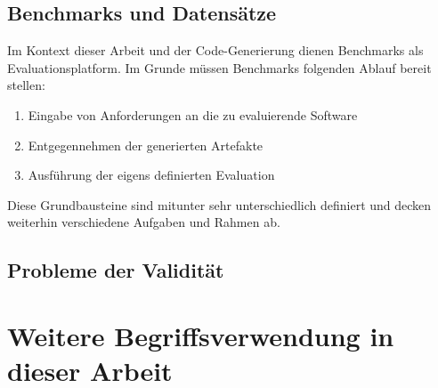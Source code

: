 
\subsection{Benchmarks und Datensätze}\label{ch:Benchmarks und Datensätze}

Im Kontext dieser Arbeit und der Code-Generierung dienen Benchmarks als Evaluationsplatform. Im Grunde müssen Benchmarks folgenden Ablauf bereit stellen:

\begin{enumerate}
    \item Eingabe von Anforderungen an die zu evaluierende Software
    \item Entgegennehmen der generierten Artefakte
    \item Ausführung der eigens definierten Evaluation
\end{enumerate}

Diese Grundbausteine sind mitunter sehr unterschiedlich definiert und decken weiterhin verschiedene Aufgaben und Rahmen ab. 


\subsection{Probleme der Validität}\label{ch:Probleme der Validität}


\section{Weitere Begriffsverwendung in dieser Arbeit}


